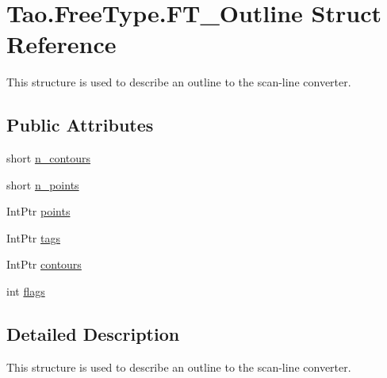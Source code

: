 \hypertarget{struct_tao_1_1_free_type_1_1_f_t___outline}{
\section{Tao.FreeType.FT\_\-Outline Struct Reference}
\label{struct_tao_1_1_free_type_1_1_f_t___outline}
}


This structure is used to describe an outline to the scan-\/line converter.  


\subsection*{Public Attributes}
\begin{DoxyCompactItemize}
\item 
short \hyperlink{struct_tao_1_1_free_type_1_1_f_t___outline_aec602b3f9421183c7c77010b9a0873a1}{n\_\-contours}
\item 
short \hyperlink{struct_tao_1_1_free_type_1_1_f_t___outline_a95c657604b4d1155ca826deccfa1dfe3}{n\_\-points}
\item 
IntPtr \hyperlink{struct_tao_1_1_free_type_1_1_f_t___outline_ab8aa99c2bfbb8bd953f0fc2bf1b95bfb}{points}
\item 
IntPtr \hyperlink{struct_tao_1_1_free_type_1_1_f_t___outline_a3fe92760de6d18fd55ab3e5730d4a374}{tags}
\item 
IntPtr \hyperlink{struct_tao_1_1_free_type_1_1_f_t___outline_ad95a652a425312de29cd84948d0e7d71}{contours}
\item 
int \hyperlink{struct_tao_1_1_free_type_1_1_f_t___outline_a42a1fc25f8f1ef8b594cfaf29feb7723}{flags}
\end{DoxyCompactItemize}


\subsection{Detailed Description}
This structure is used to describe an outline to the scan-\/line converter. 

